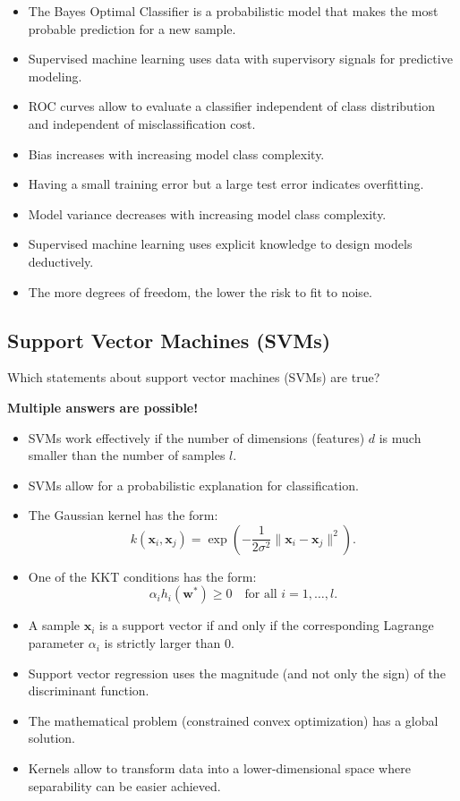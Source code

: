 \documentclass{article}
\begin{document}
\begin{itemize}
    \item[(a)] The Bayes Optimal Classifier is a probabilistic model that makes the most probable prediction for a new sample.
    \item[(b)] Supervised machine learning uses data with supervisory signals for predictive modeling.
    \item[(c)] ROC curves allow to evaluate a classifier independent of class distribution and independent of misclassification cost.
    \item[(d)] Bias increases with increasing model class complexity.
    \item[(e)] Having a small training error but a large test error indicates overfitting.
    \item[(f)] Model variance decreases with increasing model class complexity.
    \item[(g)] Supervised machine learning uses explicit knowledge to design models deductively.
    \item[(h)] The more degrees of freedom, the lower the risk to fit to noise.
\end{itemize}

\subsection*{Support Vector Machines (SVMs)}

Which statements about support vector machines (SVMs) are true?

\textbf{Multiple answers are possible!}

\begin{itemize}
    \item[(a)] SVMs work effectively if the number of dimensions (features) \(d\) is much smaller than the number of samples \(l\).
    \item[(b)] SVMs allow for a probabilistic explanation for classification.
    \item[(c)] The Gaussian kernel has the form:
    \[
    k(\mathbf{x}_i, \mathbf{x}_j) = \exp\left(-\frac{1}{2\sigma^2} \|\mathbf{x}_i - \mathbf{x}_j\|^2 \right).
    \]
    \item[(d)] One of the KKT conditions has the form:
    \[
    \alpha_i h_i(\mathbf{w}^*) \geq 0 \quad \text{for all } i = 1, \ldots, l.
    \]
    \item[(e)] A sample \(\mathbf{x}_i\) is a support vector if and only if the corresponding Lagrange parameter \(\alpha_i\) is strictly larger than 0.
    \item[(f)] Support vector regression uses the magnitude (and not only the sign) of the discriminant function.
    \item[(g)] The mathematical problem (constrained convex optimization) has a global solution.
    \item[(h)] Kernels allow to transform data into a lower-dimensional space where separability can be easier achieved.
\end{itemize}
\end{document}
